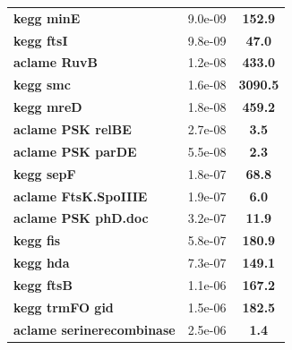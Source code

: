 \begin{landscape}
\begin{table}
{\begin{minipage}[t]{0.3\textwidth}
\begin{tabular}{>{\bfseries}p{\textwidth}cc}
\rowcolor{posit}kegg minE&9.0e-09&\textbf{\colorbox{colorpowerxxxx}{152.9}}\\
\rowcolor{posit}kegg ftsI&9.8e-09&\textbf{\colorbox{colorpowerxxx}{47.0}}\\
\rowcolor{posit}aclame RuvB&1.2e-08&\textbf{\colorbox{colorpowerxxxx}{433.0}}\\
\rowcolor{posit}kegg smc&1.6e-08&\textbf{\colorbox{colorpowerxxxx}{3090.5}}\\
\rowcolor{posit}kegg mreD&1.8e-08&\textbf{\colorbox{colorpowerxxxx}{459.2}}\\
\rowcolor{posit}aclame PSK relBE&2.7e-08&\textbf{\colorbox{colorpowerx}{3.5}}\\
\rowcolor{posit}aclame PSK parDE&5.5e-08&\textbf{\colorbox{colorpower}{2.3}}\\
\rowcolor{posit}kegg sepF&1.8e-07&\textbf{\colorbox{colorpowerxxxx}{68.8}}\\
\rowcolor{posit}aclame FtsK.SpoIIIE&1.9e-07&\textbf{\colorbox{colorpowerx}{6.0}}\\
\rowcolor{posit}aclame PSK phD.doc&3.2e-07&\textbf{\colorbox{colorpowerxx}{11.9}}\\
\rowcolor{posit}kegg fis&5.8e-07&\textbf{\colorbox{colorpowerxxxx}{180.9}}\\
\rowcolor{posit}kegg hda&7.3e-07&\textbf{\colorbox{colorpowerxxxx}{149.1}}\\
\rowcolor{posit}kegg ftsB&1.1e-06&\textbf{\colorbox{colorpowerxxxx}{167.2}}\\
\rowcolor{posit}kegg trmFO gid&1.5e-06&\textbf{\colorbox{colorpowerxxxx}{182.5}}\\
\rowcolor{posit}aclame serinerecombinase&2.5e-06&\textbf{\colorbox{colorpower}{1.4}}\\
\end{tabular}
	\end{minipage}}
	\hspace{1.7cm}
\end{table}
\end{landscape}
